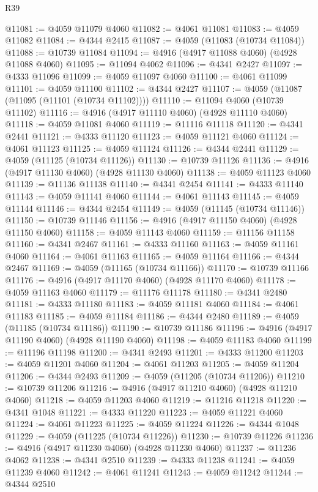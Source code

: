 \begin{lexlean}{R39}
\begin{coremodule}
@11081 := @4059 @11079 @4060
@11082 := @4061 @11081
@11083 := @4059 @11082
@11084 := @4344 @2415
@11087 := @4059 (@11083 (@10734 @11084))
@11088 := @10739 @11084
@11094 := @4916 (@4917 @11088 @4060) (@4928 @11088 @4060)
@11095 := @11094 @4062
@11096 := @4341 @2427
@11097 := @4333 @11096
@11099 := @4059 @11097 @4060
@11100 := @4061 @11099
@11101 := @4059 @11100
@11102 := @4344 @2427
@11107 := @4059 (@11087 (@11095 (@11101 (@10734 @11102))))
@11110 := @11094 @4060 (@10739 @11102)
@11116 := @4916 (@4917 @11110 @4060) (@4928 @11110 @4060)
@11118 := @4059 @11081 @4060
@11119 := @11116 @11118
@11120 := @4341 @2441
@11121 := @4333 @11120
@11123 := @4059 @11121 @4060
@11124 := @4061 @11123
@11125 := @4059 @11124
@11126 := @4344 @2441
@11129 := @4059 (@11125 (@10734 @11126))
@11130 := @10739 @11126
@11136 := @4916 (@4917 @11130 @4060) (@4928 @11130 @4060)
@11138 := @4059 @11123 @4060
@11139 := @11136 @11138
@11140 := @4341 @2454
@11141 := @4333 @11140
@11143 := @4059 @11141 @4060
@11144 := @4061 @11143
@11145 := @4059 @11144
@11146 := @4344 @2454
@11149 := @4059 (@11145 (@10734 @11146))
@11150 := @10739 @11146
@11156 := @4916 (@4917 @11150 @4060) (@4928 @11150 @4060)
@11158 := @4059 @11143 @4060
@11159 := @11156 @11158
@11160 := @4341 @2467
@11161 := @4333 @11160
@11163 := @4059 @11161 @4060
@11164 := @4061 @11163
@11165 := @4059 @11164
@11166 := @4344 @2467
@11169 := @4059 (@11165 (@10734 @11166))
@11170 := @10739 @11166
@11176 := @4916 (@4917 @11170 @4060) (@4928 @11170 @4060)
@11178 := @4059 @11163 @4060
@11179 := @11176 @11178
@11180 := @4341 @2480
@11181 := @4333 @11180
@11183 := @4059 @11181 @4060
@11184 := @4061 @11183
@11185 := @4059 @11184
@11186 := @4344 @2480
@11189 := @4059 (@11185 (@10734 @11186))
@11190 := @10739 @11186
@11196 := @4916 (@4917 @11190 @4060) (@4928 @11190 @4060)
@11198 := @4059 @11183 @4060
@11199 := @11196 @11198
@11200 := @4341 @2493
@11201 := @4333 @11200
@11203 := @4059 @11201 @4060
@11204 := @4061 @11203
@11205 := @4059 @11204
@11206 := @4344 @2493
@11209 := @4059 (@11205 (@10734 @11206))
@11210 := @10739 @11206
@11216 := @4916 (@4917 @11210 @4060) (@4928 @11210 @4060)
@11218 := @4059 @11203 @4060
@11219 := @11216 @11218
@11220 := @4341 @1048
@11221 := @4333 @11220
@11223 := @4059 @11221 @4060
@11224 := @4061 @11223
@11225 := @4059 @11224
@11226 := @4344 @1048
@11229 := @4059 (@11225 (@10734 @11226))
@11230 := @10739 @11226
@11236 := @4916 (@4917 @11230 @4060) (@4928 @11230 @4060)
@11237 := @11236 @4062
@11238 := @4341 @2510
@11239 := @4333 @11238
@11241 := @4059 @11239 @4060
@11242 := @4061 @11241
@11243 := @4059 @11242
@11244 := @4344 @2510

\end{coremodule}
\end{lexlean}
